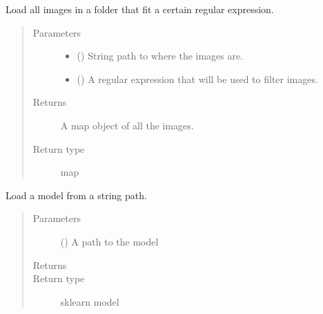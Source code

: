 \documentclass[letterpaper,10pt,english]{sphinxmanual}
\begin{document}
\begin{fulllineitems}
\label{\detokenize{api:readpyne.io.get_data}}
Load all images in a folder that fit a certain regular expression.
\begin{quote}\begin{description}
\item[{Parameters}] \leavevmode\begin{itemize}
\item {} 
 () \textendash{} String path to where the images are.

\item {} 
 () \textendash{} A regular expression that will be used to filter images.

\end{itemize}

\item[{Returns}] \leavevmode
A map object of all the images.

\item[{Return type}] \leavevmode
map

\end{description}\end{quote}

\end{fulllineitems}


\begin{fulllineitems}
\label{\detokenize{api:readpyne.io.load_model}}
Load a model from a string path.
\begin{quote}\begin{description}
\item[{Parameters}] \leavevmode
{} () \textendash{} A path to the model

\item[{Returns}] \leavevmode


\item[{Return type}] \leavevmode
sklearn model

\end{description}\end{quote}

\end{fulllineitems}
\end{document}
